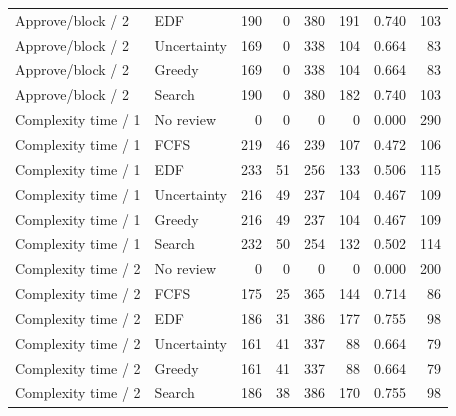 \begin{table}[t]
\begin{tabular}{llrrrrrr}
Approve/block / 2 & EDF & 190 & 0 & 380 & 191 & 0.740 & 103 \\
Approve/block / 2 & Uncertainty & 169 & 0 & 338 & 104 & 0.664 & 83 \\
Approve/block / 2 & Greedy & 169 & 0 & 338 & 104 & 0.664 & 83 \\
Approve/block / 2 & Search & 190 & 0 & 380 & 182 & 0.740 & 103 \\
Complexity time / 1 & No review & 0 & 0 & 0 & 0 & 0.000 & 290 \\
Complexity time / 1 & FCFS & 219 & 46 & 239 & 107 & 0.472 & 106 \\
Complexity time / 1 & EDF & 233 & 51 & 256 & 133 & 0.506 & 115 \\
Complexity time / 1 & Uncertainty & 216 & 49 & 237 & 104 & 0.467 & 109 \\
Complexity time / 1 & Greedy & 216 & 49 & 237 & 104 & 0.467 & 109 \\
Complexity time / 1 & Search & 232 & 50 & 254 & 132 & 0.502 & 114 \\
Complexity time / 2 & No review & 0 & 0 & 0 & 0 & 0.000 & 200 \\
Complexity time / 2 & FCFS & 175 & 25 & 365 & 144 & 0.714 & 86 \\
Complexity time / 2 & EDF & 186 & 31 & 386 & 177 & 0.755 & 98 \\
Complexity time / 2 & Uncertainty & 161 & 41 & 337 & 88 & 0.664 & 79 \\
Complexity time / 2 & Greedy & 161 & 41 & 337 & 88 & 0.664 & 79 \\
Complexity time / 2 & Search & 186 & 38 & 386 & 170 & 0.755 & 98 \\
\bottomrule
\end{tabular}
\end{table}

